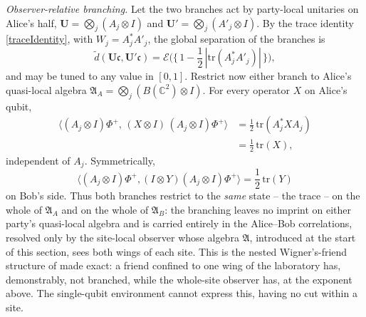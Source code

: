 \documentclass[twoside,11pt,letter]{article}
\def\bC{\mathbb{C}}
\def\fc{{\mathfrak{c}}}
\newcommand{\tr}{\mathrm{tr}}
\newcommand{\cexp}{\mathcal{E}}  %
\theoremstyle{definition}
\theoremstyle{definition}
\theoremstyle{plain}
\begin{document}
\smallskip
\noindent\emph{Observer-relative branching.} Let the two branches act by party-local unitaries on Alice's half, $\mathbf{U}=\bigotimes_j(A_j\otimes I)$ and $\mathbf{U}'=\bigotimes_j(A'_j\otimes I)$. By the trace identity \eqref{traceIdentity}, with $W_j=A_j^\ast A'_j$, the global separation of the branches is
\begin{equation*}
\tilde d(\mathbf{U}\fc,\mathbf{U}'\fc)=\cexp\big(\big\{\,1-\frac12\,|\tr(A_j^\ast A'_j)|\,\big\}\big),
\end{equation*}
and may be tuned to any value in $[0,1]$. Restrict now either branch to Alice's quasi-local algebra $\mathfrak{A}_A=\bigotimes_j(B(\bC^2)\otimes I)$. For every operator $X$ on Alice's qubit,
\begin{equation}\label{traceInvariance}
\begin{split}
\big\langle (A_j\otimes I)\Phi^+,\,(X\otimes I)\,(A_j\otimes I)\Phi^+\big\rangle
&=\frac12\,\tr(A_j^\ast X A_j)\\
&=\frac12\,\tr(X),
\end{split}
\end{equation}
independent of $A_j$. Symmetrically,
\begin{equation}
\langle(A_j\otimes I)\Phi^+,(I\otimes Y)(A_j\otimes I)\Phi^+\rangle=\frac12\,\tr(Y)
\end{equation}
on Bob's side. Thus both branches restrict to the \emph{same} state -- the trace -- on the whole of $\mathfrak{A}_A$ and on the whole of $\mathfrak{A}_B$: the branching leaves no imprint on either party's quasi-local algebra and is carried entirely in the Alice--Bob correlations, resolved only by the site-local observer whose algebra $\mathfrak{A}$, introduced at the start of this section, sees both wings of each site. This is the nested Wigner's-friend structure of \cite{S26} made exact: a friend confined to one wing of the laboratory has, demonstrably, not branched, while the whole-site observer has, at the exponent above. The single-qubit environment cannot express this, having no cut within a site.
\end{document}

